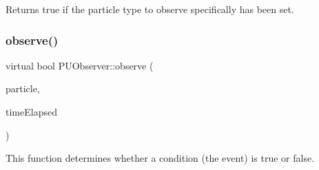 Returns true if the particle type to observe specifically has been set. \mbox{\label{classPUObserver_a50f59cc3245e291b641463db5d3037f7}} 
\subsubsection{\texorpdfstring{observe()}{observe()}\hspace{0.1cm}{\footnotesize\ttfamily [1/2]}}
{\footnotesize\ttfamily virtual bool P\+U\+Observer\+::observe (\begin{DoxyParamCaption}\item[{\hyperlink{structPUParticle3D}{P\+U\+Particle3D} $\ast$}]{particle,  }\item[{float}]{time\+Elapsed }\end{DoxyParamCaption})\hspace{0.3cm}{\ttfamily [pure virtual]}}

This function determines whether a condition (the event) is true or false. 

